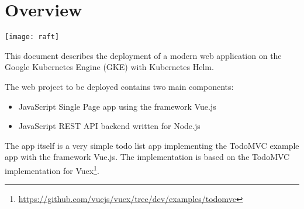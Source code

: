 




\begin{titlepage}
\afterpage{\restorepagecolor}
\newcommand{\colorRule}[3][black]{\textcolor[HTML]{#1}{\rule{#2}{#3}}}
\end{titlepage}
\restoregeometry



{
\hypersetup{linkcolor=}
\setcounter{tocdepth}{2}
\tableofcontents
\pagebreak
}


















\section{Overview}\label{overview}

\texttt{[image: raft]}

This document describes the deployment of a modern web application on
the Google Kubernetes Engine (GKE) with Kubernetes Helm.

The web project to be deployed contains two main components:

\begin{itemize}
\tightlist
\item
  JavaScript Single Page app using the framework Vue.js
\item
  JavaScript REST API backend written for Node.js
\end{itemize}

The app itself is a very simple todo list app implementing the TodoMVC
example app with the framework Vue.js. The implementation is based on
the TodoMVC implementation for Vuex\footnote{\url{https://github.com/vuejs/vuex/tree/dev/examples/todomvc}}.


